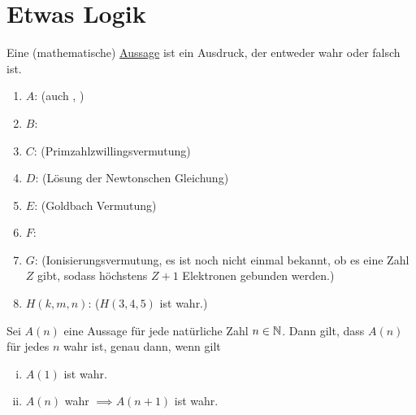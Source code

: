 \documentclass[../ana1.tex]{subfiles}
\begin{document}
\setcounter{section}{1}

\section{Etwas Logik}
\begin{defi*}
	Eine (mathematische) \underline{Aussage} ist ein Ausdruck, der entweder wahr oder falsch ist.
\end{defi*}

\begin{bspe}\leavevmode
	\begin{enumerate}[(1)]
		\item \(A \):   (auch , )
		\item \(B \): 
		\item \(C \):  (Primzahlzwillingsvermutung)
		\item \(D \):  (Lösung der Newtonschen Gleichung)
		\item \(E \):  (Goldbach Vermutung)
		\item \(F \): 
		\item \(G \):  (Ionisierungsvermutung, es ist noch nicht einmal bekannt, ob es eine Zahl \(Z \) gibt, sodass höchstens \(Z+1 \) Elektronen gebunden werden.)
		\item \(H(k,m,n) \):  (\zB \(H(3,4,5) \) ist wahr.)
	\end{enumerate}
\end{bspe}

\begin{bem}
	Sei  \(A(n) \) eine Aussage für jede natürliche Zahl \(n\in \mathbb{N} \). Dann gilt, dass
	\(A(n) \) für jedes \(n \) wahr ist, genau dann, wenn gilt
	\begin{enumerate}[(i)]
		\item \(A(1) \) ist wahr.
		\item \(A(n) \) wahr \(\implies A(n+1) \) ist wahr.
	\end{enumerate}
\end{bem}
\end{document}

